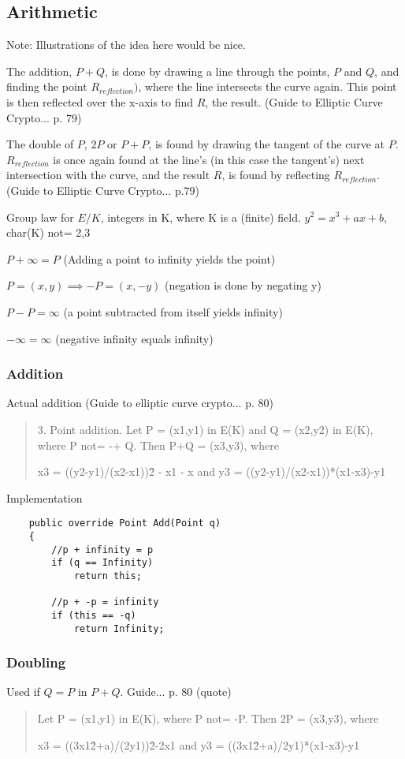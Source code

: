 \subsection{Arithmetic}

Note: Illustrations of the idea here would be nice.

The addition, \(P + Q\), is done by drawing a line through the points, \(P\) and \(Q\),
and finding the point \(R_{reflection})\), where the line intersects the curve again. This point is
then reflected over the x-axis to find \(R\), the result. (Guide to Elliptic Curve Crypto... p. 79)

The double of \(P\), \(2P\) or \(P+P\), is found by drawing the tangent of the curve at \(P\).
\(R_{reflection}\) is once again found at the line's (in this case the tangent's) next intersection
with the curve, and the result \(R\), is found by reflecting \(R_{reflection}\). (Guide to Elliptic Curve Crypto... p.79)

Group law for \(E/K\), integers in K, where K is a (finite) field.
\(y^2 = x^3 + ax + b\), char(K) not= 2,3

\(P + \infty = P\) (Adding a point to infinity yields the point)

\(P=(x,y) \implies -P=(x,-y)\) (negation is done by negating y)

\(P - P = \infty\) (a point subtracted from itself yields infinity)

\(-\infty = \infty\) (negative infinity equals infinity)

\subsubsection{Addition}

Actual addition (Guide to elliptic curve crypto... p. 80)
\begin{quote}
	3. Point addition. Let P = (x1,y1) in E(K) and Q = (x2,y2) in E(K), where P not= -+ Q.
	Then P+Q = (x3,y3), where
	
	x3 = ((y2-y1)/(x2-x1))\^2 - x1 - x    and    y3 = ((y2-y1)/(x2-x1))*(x1-x3)-y1
\end{quote}

Implementation
\begin{verbatim}
	public override Point Add(Point q)
	{
	    //p + infinity = p
	    if (q == Infinity)
	        return this;

	    //p + -p = infinity
	    if (this == -q)
	        return Infinity;
\end{verbatim}

\subsubsection{Doubling}

Used if \(Q = P\) in \(P + Q\). Guide... p. 80 (quote)
\begin{quote}
	Let P = (x1,y1) in E(K), where P not= -P. Then 2P = (x3,y3), where
	
	x3 = ((3x1\^2+a)/(2y1))\^2-2x1    and    y3 = ((3x1\^2+a)/2y1)*(x1-x3)-y1
\end{quote}